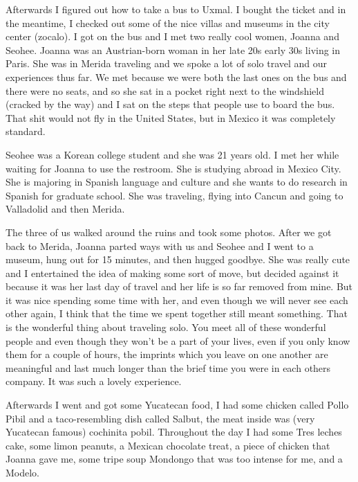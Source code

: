 \documentclass[12pt]{article}
\begin{document}
\hfill

Afterwards I figured out how to take a bus to Uxmal. I bought the ticket and in the meantime, I checked out some of the nice villas and museums in the city center (zocalo). I got on the bus and I met two really cool women, Joanna and Seohee. Joanna was an Austrian-born woman in her late 20s early 30s living in Paris. She was in Merida traveling and we spoke a lot of solo travel and our experiences thus far. We met because we were both the last ones on the bus and there were no seats, and so she sat in a pocket right next to the windshield (cracked by the way) and I sat on the steps that people use to board the bus. That shit would not fly in the United States, but in Mexico it was completely standard.

\hfill

Seohee was a Korean college student and she was 21 years old. I met her while waiting for Joanna to use the restroom. She is studying abroad in Mexico City. She is majoring in Spanish language and culture and she wants to do research in Spanish for graduate school. She was traveling, flying into Cancun and going to Valladolid and then Merida. 

\hfill

The three of us walked around the ruins and took some photos. After we got back to Merida, Joanna parted ways with us and Seohee and I went to a museum, hung out for 15 minutes, and then hugged goodbye. She was really cute and I entertained the idea of making some sort of move, but decided against it because it was her last day of travel and her life is so far removed from mine. But it was nice spending some time with her, and even though we will never see each other again, I think that the time we spent together still meant something. That is the wonderful thing about traveling solo. You meet all of these wonderful people and even though they won’t be a part of your lives, even if you only know them for a couple of hours, the imprints which you leave on one another are meaningful and last much longer than the brief time you were in each others company. It was such a lovely experience.

\hfill

Afterwards I went and got some Yucatecan food, I had some chicken called Pollo Pibil and a taco-resembling dish called Salbut, the meat inside was (very Yucatecan famous) cochinita pobil.
Throughout the day I had some Tres leches cake, some limon peanuts, a Mexican chocolate treat, a piece of chicken that Joanna gave me, some tripe soup Mondongo that was too intense for me, and a Modelo.
\end{document}

